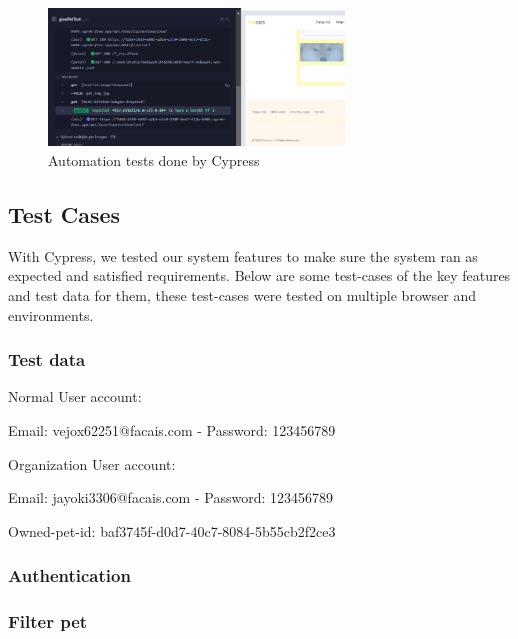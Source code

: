 \begin{figure}[H]
    \centering
    \includegraphics[width=0.7\textwidth]{Figures/cypress_auto.png}
    \caption{Automation tests done by Cypress}
    \label{fig:cypress-test}
\end{figure}

\subsection{Test Cases}
With Cypress, we tested our system features to make sure the system ran as expected and satisfied requirements. Below are some test-cases of the key features and test data for them, these test-cases were tested on multiple browser and environments.

\subsubsection*{Test data}

Normal User account:

\quad Email: vejox62251@facais.com - Password: 123456789

Organization User account:

\quad Email:  jayoki3306@facais.com - Password: 123456789

Owned-pet-id: baf3745f-d0d7-40c7-8084-5b55cb2f2ce3

\subsubsection*{Authentication}









\subsubsection*{Filter pet}

